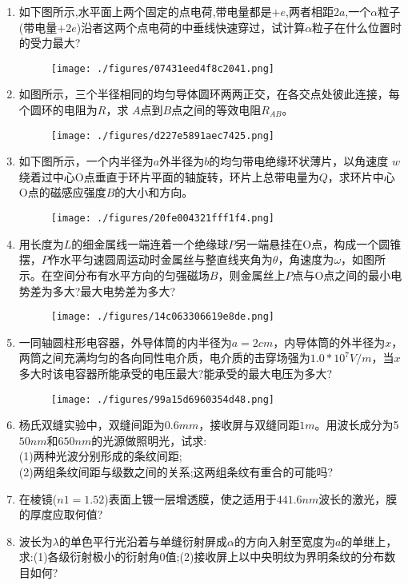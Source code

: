 \begin{enumerate}
\item 如下图所示,水平面上两个固定的点电荷,带电量都是$+e$,两者相距$ 2a$,一个$\alpha $粒子(带电量$+2e$)沿者这两个点电荷的中垂线快速穿过，试计算$\alpha$粒子在什么位置时的受力最大?
\begin{figure}[ht]
\centering
\texttt{[image: ./figures/07431eed4f8c2041.png]}
\caption{} \label{fig_SD12_1}
\end{figure}
\item 如图所示，三个半径相同的均匀导体圆环两两正交，在各交点处彼此连接，每个圆环的电阻为$R$，求 $A$点到$B$点之间的等效电阻$R_{AB}$。
\begin{figure}[ht]
\centering
\texttt{[image: ./figures/d227e5891aec7425.png]}
\caption{} \label{fig_SD12_2}
\end{figure}
\item 如下图所示，一个内半径为$ a$外半径为$b$的均匀带电绝缘环状薄片，以角速度 $w $绕着过中心O点垂直于环片平面的轴旋转，环片上总带电量为$Q$，求环片中心O点的磁感应强度$B$的大小和方向。
\begin{figure}[ht]
\centering
\texttt{[image: ./figures/20fe004321fff1f4.png]}
\caption{} \label{fig_SD12_3}
\end{figure}
\item 用长度为$L$的细金属线一端连着一个绝缘球$P$另一端悬挂在O点，构成一个圆锥摆，$P$作水平匀速圆周运动时金属丝与整直线夹角为$\theta$，角速度为$\omega$，如图所示。在空间分布有水平方向的匀强磁场$B$，则金属丝上$P$点与O点之间的最小电势差为多大?最大电势差为多大?
\begin{figure}[ht]
\centering
\texttt{[image: ./figures/14c063306619e8de.png]}
\caption{} \label{fig_SD12_4}
\end{figure}
\item 一同轴圆柱形电容器，外导体筒的内半径为$a=2cm$，内导体筒的外半径为$x$，两筒之间充满均匀的各向同性电介质，电介质的击穿场强为$1.0*10^7 V/m$，当$x$多大时该电容器所能承受的电压最大?能承受的最大电压为多大?
\begin{figure}[ht]
\centering
\texttt{[image: ./figures/99a15d6960354d48.png]}
\caption{} \label{fig_SD12_5}
\end{figure}
\item 杨氏双缝实验中，双缝间距为$0.6mm$，接收屏与双缝同距$1m$。用波长成分为5$50nm$和$650nm$的光源做照明光，试求:\\
(1)两种光波分别形成的条纹间距;\\
(2)两组条纹间距与级数之间的关系;这两组条纹有重合的可能吗?
\item 在棱镜($n1=1.52$)表面上镀一层增透膜，使之适用于$441.6nm $波长的激光，膜的厚度应取何值?
\item 波长为$\lambda$的单色平行光沿着与单缝衍射屏成$\alpha$的方向入射至宽度为$a$的单继上，求:(1)各级衍射极小的衍射角0值;(2)接收屏上以中央明纹为界明条纹的分布数目如何?
\end{enumerate}